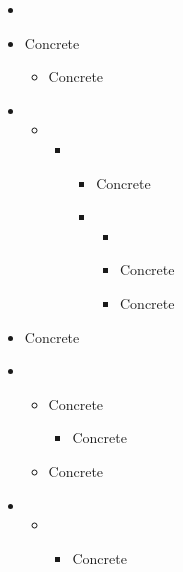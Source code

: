 \begin{itemize}
 \item[\clsnmref{Debugger}]
 \item[\clsnmref{Convergence}] Concrete
   \begin{itemize}
     \item[\clsnmref{MolEnergyConvergence}] Concrete
   \end{itemize}
 \item[\clsnmref{Function}]
   \begin{itemize}
     \item[\clsnmref{MolecularEnergy}]
     \begin{itemize}
       \item[\clsnmref{Wavefunction}]
       \begin{itemize}
         \item[\clsnmref{MBPT2}] Concrete
         \item[\clsnmref{OneBodyWavefunction}]
         \begin{itemize}
           \item[\clsnmref{SCF}]
         \end{itemize}
           \begin{itemize}
             \item[\clsnmref{CLSCF}] Concrete
             \item[\clsnmref{HSOSSCF}] Concrete
           \end{itemize}
       \end{itemize}
     \end{itemize}
   \end{itemize}
 \item[\clsnmref{GaussianBasisSet}] Concrete
 \item[\clsnmref{HessianUpdate}]
   \begin{itemize}
     \item[\clsnmref{DFPUpdate}] Concrete
       \begin{itemize}
         \item[\clsnmref{BFGSUpdate}] Concrete
       \end{itemize}
     \item[\clsnmref{PowellUpdate}] Concrete
   \end{itemize}
 \item[\clsnmref{IntCoor}]
   \begin{itemize}
     \item[\clsnmref{SimpleCo}]
       \begin{itemize}
         \item[\clsnmref{BendSimpleCo}] Concrete

\end{itemize}
\end{itemize}
\end{itemize}
